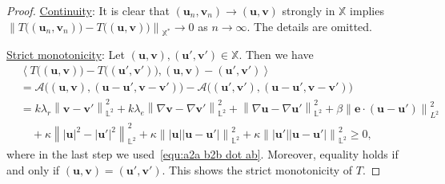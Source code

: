 \documentclass[11pt, reqno]{amsart}
\theoremstyle{definition}
\theoremstyle{remark}
\numberwithin{equation}{section}
\newcommand{\bff}{\boldsymbol}
\newcommand{\bb}{\mathbb}
\newcommand{\norm}[2]{\left\|{#1}\right\|_{#2}}
\newcommand{\inpro}[2]{\left\langle#1,#2\right\rangle}
\newcommand{\abs}[1]{\left|{#1}\right|}
\begin{document}
\begin{proof}
\medskip
\noindent
\underline{Continuity}: It is clear that $(\bff{u}_n, \bff{v}_n)\to (\bff{u},\bff{v})$ strongly in $\bb{X}$ implies $\norm{T\big((\bff{u}_n,\bff{v}_n)\big) - T\big((\bff{u}, \bff{v})\big)}{\bb{X}^\ast} \to 0$ as $n\to\infty$. The details are omitted.
%

\medskip
\noindent
\underline{Strict monotonicity}: Let $(\bff{u},\bff{v}), (\bff{u}',\bff{v}')\in \bb{X}$. Then we have
\begin{align*}
	&\inpro{T\big((\bff{u},\bff{v})\big)- T\big((\bff{u}',\bff{v}')\big)}{(\bff{u},\bff{v})-(\bff{u}',\bff{v}')}
	\\
	&=
	\mathcal{A}\big((\bff{u},\bff{v}), (\bff{u}-\bff{u}',\bff{v}-\bff{v}')\big)
	-
	\mathcal{A}\big((\bff{u}',\bff{v}'), (\bff{u}-\bff{u}',\bff{v}-\bff{v}')\big)
	\\
	&=
	k\lambda_r \norm{\bff{v}-\bff{v}'}{\bb{L}^2}^2
	+
	k \lambda_e \norm{\nabla \bff{v}-\nabla \bff{v}'}{\bb{L}^2}^2
	+
	\norm{\nabla \bff{u}-\nabla \bff{u}'}{\bb{L}^2}^2
	+
	\beta \norm{\bff{e}\cdot (\bff{u}-\bff{u}')}{L^2}^2
	\\
	&\quad
	+
	\kappa \norm{\abs{\bff{u}}^2- \abs{\bff{u}'}^2}{\bb{L}^2}^2
	+
	\kappa \norm{\abs{\bff{u}} \abs{\bff{u}-\bff{u}'}}{\bb{L}^2}^2
	+
	\kappa \norm{\abs{\bff{u}'} \abs{\bff{u}-\bff{u}'}}{\bb{L}^2}^2 \geq 0,
\end{align*}
where in the last step we used~\eqref{equ:a2a b2b dot ab}. Moreover, equality holds if and only if $(\bff{u},\bff{v})=(\bff{u}',\bff{v}')$. This shows the strict monotonicity of $T$.


\end{proof}
\end{document}
